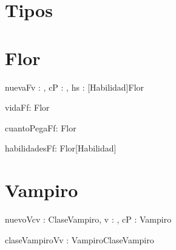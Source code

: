 \documentclass[spanish,a4paper]{article}
\begin{document}



\titulotp


\section{Tipos}



\section{Flor}


\begin{problema}{nuevaF}{v : \ent, cP : \ent, hs : [Habilidad]}{Flor}
\end{problema}

\begin{problema}{vidaF}{f: Flor}{\ent}
\end{problema}

\begin{problema}{cuantoPegaF}{f: Flor}{\ent}
\end{problema}

\begin{problema}{habilidadesF}{f: Flor}{[Habilidad]}
\end{problema}



\section{Vampiro}


\begin{problema}{nuevoV}{cv : ClaseVampiro, v : \ent, cP : \ent}{Vampiro}
\end{problema}

\begin{problema}{claseVampiroV}{v : Vampiro}{ClaseVampiro}
\end{problema}
\end{document}
